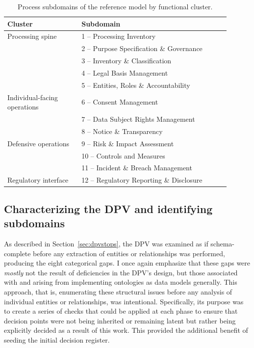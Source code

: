 \documentclass[10pt,letterpaper,twocolumn,twoside]{rho-class/rho}
\begin{document}
\begin{table}[ht]
\centering
\caption{Process subdomains of the reference model by functional cluster.}
\label{tab:clusters}
\footnotesize
\begin{tabular}{@{}p{0.30\linewidth} p{0.60\linewidth}@{}}
\hline
Cluster & Subdomain \\
\hline
Processing spine & 1 -- Processing Inventory \\
 & 2 -- Purpose Specification \& Governance \\
 & 3 -- Inventory \& Classification \\
 & 4 -- Legal Basis Management \\
 & 5 -- Entities, Roles \& Accountability \\
\hline
Individual-facing operations & 6 -- Consent Management \\
 & 7 -- Data Subject Rights Management \\
 & 8 -- Notice \& Transparency \\
\hline
Defensive operations & 9 -- Risk \& Impact Assessment \\
 & 10 -- Controls and Measures \\
 & 11 -- Incident \& Breach Management \\
\hline
Regulatory interface & 12 -- Regulatory Reporting \& Disclosure \\
\hline
\end{tabular}
\end{table}


\subsection{Characterizing the DPV and identifying subdomains}\label{sec:gapledger}

As described in Section~\ref{sec:dpvstops}, the DPV was examined as if schema-complete before any extraction of entities or relationships was performed, producing the eight categorical gaps. I once again emphasize that these gaps were \textit{mostly} not the result of deficiencies in the DPV's design, but those associated with and arising from implementing ontologies as data models generally. This approach, that is, enumerating these structural issues before any analysis of individual entities or relationships, was intentional. Specifically, its purpose was to create a series of checks that could be applied at each phase to ensure that decision points were not being inherited or remaining latent but rather being explicitly decided as a result of this work. This provided the additional benefit of seeding the initial decision register. 
\end{document}
